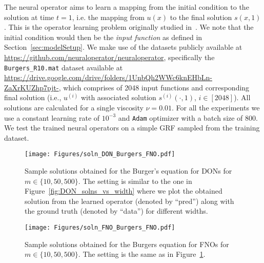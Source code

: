 The neural operator aims to learn a mapping from the initial condition to the solution at time $t=1$, i.e. the mapping from $u(x)$ to the final solution $s(x, 1)$.  This is the operator learning problem originally studied in~\citep{li_fourier_2021}. 
We note that the initial condition would then be the \emph{input function} as defined in Section~\ref{sec:modelSetup}. We make use of the datasets publicly available at \url{https://github.com/neuraloperator/neuraloperator}, specifically the \texttt{Burgers\_R10.mat} dataset available at \url{https://drive.google.com/drive/folders/1UnbQh2WWc6knEHbLn-ZaXrKUZhp7pjt-}, which comprises of 2048 input functions and corresponding final solution (i.e., $u^{(i)}$ with associated solution $s^{(i)}(\cdot,1)$, $i\in[2048]$). All solutions are calculated for a single viscosity $\nu=0.01$. 
%
For all the experiments we use a constant learning rate of $10^{-3}$ and \texttt{Adam} optimizer with a batch size of $800$. We test the trained neural operators on a simple GRF sampled from the training dataset.
%
%
%
\begin{figure}[t!]
    \centering
    \texttt{[image: Figures/soln\_DON\_Burgers\_FNO.pdf]}
    \caption{Sample solutions obtained for the Burger's equation for DONs for $m\in \{10, 50, 500\}$. The setting is similar to the one in Figure~\ref{fig:DON_solns_vs_width} where we plot the obtained solution from the learned operator (denoted by ``pred'') along with the ground truth (denoted by ``data'') for different widths. 
    }
    \label{fig:DON_solns_Burgers_vs_width}
\end{figure}
%
\begin{figure}[t!]
    \centering
    \texttt{[image: Figures/soln\_FNO\_Burgers\_FNO.pdf]}
    \caption{Sample solutions obtained for the Burgers equation for FNOs for $m\in \{10, 50, 500\}$. The setting is the same as in Figure~\ref{fig:DON_solns_Burgers_vs_width}.}
    \label{fig:FNO_solns_Burgers_vs_width}
\end{figure}

